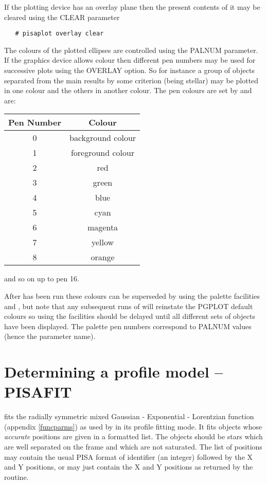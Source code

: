If the plotting device has an overlay plane then the present contents of
it may be cleared using the CLEAR parameter
\begin{verbatim}
   # pisaplot overlay clear
\end{verbatim}

The colours of the plotted ellipses are controlled using the PALNUM
parameter. If the graphics device allows colour then different pen
numbers may be used for successive plots using the OVERLAY option. So for
instance a group of objects separated from the main results by some
criterion (being stellar) may be plotted in one colour and the others in
another colour. The pen colours are set by  and are:
\begin{center}
\begin{tabular}{|c|c|}
\hline
Pen Number & Colour \\
\hline
\hline
0 & background colour \\
1 & foreground colour \\
2 & red \\
3 & green \\
4 & blue \\
5 & cyan \\
6 & magenta \\
7 & yellow \\
8 & orange \\
\hline
\end{tabular}
\end{center}
and so on up to pen 16.

After  has been run these colours can be superseded by
using the  palette facilities
 and , but
note that any subsequent runs of  will reinstate the
PGPLOT default colours so using the  facilities
should be delayed until all different sets of objects have been
displayed. The  palette pen numbers correspond to
PALNUM values (hence the parameter name).


\section{Determining a profile model -- PISAFIT}
 fits the radially symmetric mixed Gaussian -
Exponential - Lorentzian function (appendix \ref{funcparms}) as used
by  in its profile fitting mode. It fits objects whose
{\em accurate} positions are given in a formatted list. The objects
should be stars which are well separated on the frame and which are
not saturated. The list of positions may contain the usual PISA format
of identifier (an integer) followed by the X and Y positions, or may
just contain the X and Y positions as returned by the  routine.

